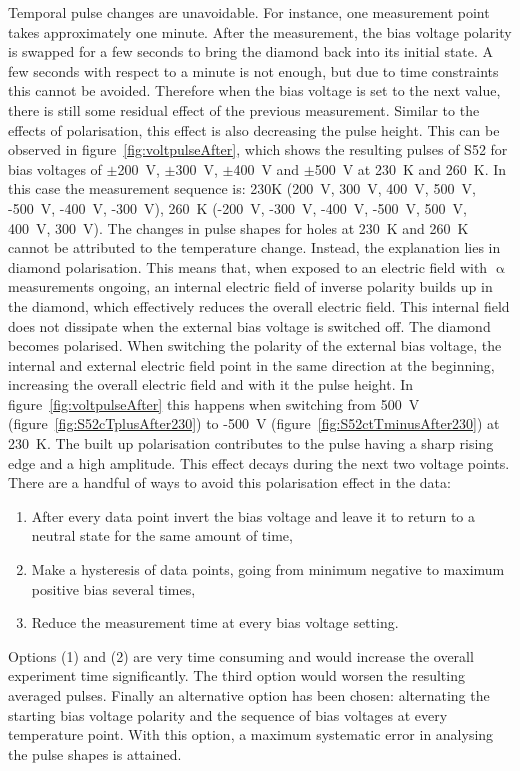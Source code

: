 Temporal pulse changes are unavoidable. For instance, one measurement point takes approximately one minute. After the measurement, the bias voltage polarity is swapped for a few seconds to bring the diamond back into its initial state. A few seconds with respect to a minute is not enough, but due to time constraints this cannot be avoided. Therefore when the bias voltage is set to the next value, there is still some residual effect of the previous measurement. Similar to the effects of polarisation, this effect is also decreasing the pulse height. This can be observed in figure~\ref{fig:voltpulseAfter}, which shows the resulting pulses of S52 for bias voltages of $\pm$200~V, $\pm$300~V, $\pm$400~V and $\pm$500~V at 230~K and 260~K. In this case the measurement sequence is: 230K (200~V, 300~V, 400~V, 500~V, -500~V, -400~V, -300~V), 260~K (-200~V, -300~V, -400~V, -500~V, 500~V, 400~V, 300~V). The changes in pulse shapes for holes at 230~K and 260~K cannot be attributed to the temperature change. Instead, the explanation lies in diamond polarisation. This means that, when exposed to an electric field with $\upalpha$ measurements ongoing, an internal electric field of inverse polarity builds up in the diamond, which effectively reduces the overall electric field. This internal field does not dissipate when the external bias voltage is switched off. The diamond becomes polarised. When switching the polarity of the external bias voltage, the internal and external electric field point in the same direction at the beginning, increasing the overall electric field and with it the pulse height. In figure~\ref{fig:voltpulseAfter} this happens when switching from 500~V (figure~\ref{fig:S52cTplusAfter230}) to -500~V (figure~\ref{fig:S52ctTminusAfter230}) at 230~K. The built up polarisation contributes to the pulse having a sharp rising edge and a high amplitude. This effect decays during the next two voltage points. There are a handful of ways to avoid this polarisation effect in the data: 

\begin{enumerate}[itemsep=0.1\baselineskip]
\item After every data point invert the bias voltage and leave it to return to a neutral state for the same amount of time, 
\item Make a hysteresis of data points, going from minimum negative to maximum positive bias several times, 
\item Reduce the measurement time at every bias voltage setting.
\end{enumerate}
Options (1) and (2) are very time consuming and would increase the overall experiment time significantly. The third option would worsen the resulting averaged pulses. Finally an alternative option has been chosen: alternating the starting bias voltage polarity and the sequence of bias voltages at every temperature point. With this option, a maximum systematic error in analysing the pulse shapes is attained.




